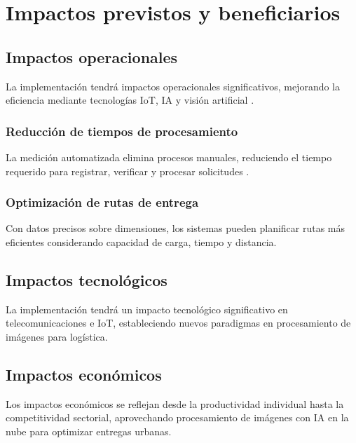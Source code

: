 \section{Impactos previstos y beneficiarios}

\subsection{Impactos operacionales}

La implementación tendrá impactos operacionales significativos, mejorando la eficiencia mediante tecnologías IoT, IA y visión artificial \cite{RedaccinTLW2024,Alharbi2023}.

\subsubsection{Reducción de tiempos de procesamiento}

La medición automatizada elimina procesos manuales, reduciendo el tiempo requerido para registrar, verificar y procesar solicitudes \cite{Xu2012}.

\subsubsection{Optimización de rutas de entrega}

Con datos precisos sobre dimensiones, los sistemas pueden planificar rutas más eficientes considerando capacidad de carga, tiempo y distancia.

\subsection{Impactos tecnológicos}

La implementación tendrá un impacto tecnológico significativo en telecomunicaciones e IoT, estableciendo nuevos paradigmas en procesamiento de imágenes para logística.

\subsection{Impactos económicos}

Los impactos económicos se reflejan desde la productividad individual hasta la competitividad sectorial, aprovechando procesamiento de imágenes con IA en la nube para optimizar entregas urbanas.

